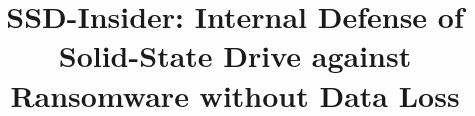 \documentclass[conference]{IEEEtran}
\newcommand{\ours}{SSD-Insider}
\begin{document}
%
\title{\ours{}: Internal Defense of Solid-State Drive against Ransomware without Data Loss}



% 




\end{document}
